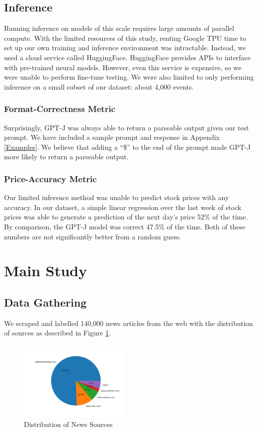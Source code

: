 \documentclass[conference]{IEEEtran}
\begin{document}
\subsection{Inference}
Running inference on models of this scale requires large amounts of parallel compute. With the limited resources of this study, renting Google TPU time to set up our own training and inference environment was intractable. Instead, we used a cloud service called HuggingFace. HuggingFace provides APIs to interface with pre-trained neural models. However, even this service is expensive, so we were unable to perform fine-tune testing. We were also limited to only performing inference on a small subset of our dataset: about 4,000 events.
\subsubsection{Format-Correctness Metric}
Surprisingly, GPT-J was always able to return a parseable output given our test prompt. We have included a sample prompt and response in Appendix \ref{Examples}. We believe that adding a ``\$'' to the end of the prompt made GPT-J more likely to return a parseable output.
\subsubsection{Price-Accuracy Metric}
Our limited inference method was unable to predict stock prices with any accuracy. In our dataset, a simple linear regression over the last week of stock prices was able to generate a prediction of the next day's price 52\% of the time. By comparison, the GPT-J model was correct 47.5\% of the time. Both of these numbers are not significantly better from a random guess. 

\section{Main Study}
\subsection{Data Gathering}
We scraped and labelled 140,000 news articles from the web with the distribution of sources as described in Figure \ref{fig:newsSources}. 
\begin{figure}[h]
    \centering
    \includegraphics[width=0.48\textwidth]{domainCounts}
    \caption{Distribution of News Sources}
    \label{fig:newsSources}
\end{figure}
\end{document}

